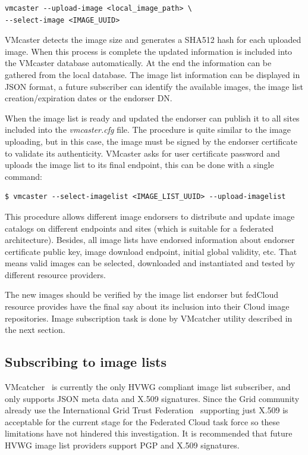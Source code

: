 \documentclass{cai}
\begin{document}
\begin{verbatim}
vmcaster --upload-image <local_image_path> \
--select-image <IMAGE_UUID>
\end{verbatim}

VMcaster detects the image size and generates a SHA512 hash for each uploaded image. When this process is complete the updated information is included into the VMcaster database automatically.
At the end the information can be gathered from the local database. 
The image list information can be displayed in JSON format, a future subscriber can identify the available images, the image list creation/expiration dates or the endorser DN.

When the image list is ready and updated the endorser can publish it to all sites included into the \textit{vmcaster.cfg} file. 
The procedure is quite similar to the image uploading, but in this case, the image must be signed by the endorser certificate to validate its authenticity.
VMcaster asks for user certificate password and uploads the image list to its final endpoint, this can be done with a single command:
\begin{verbatim}
$ vmcaster --select-imagelist <IMAGE_LIST_UUID> --upload-imagelist
\end{verbatim}
This procedure allows different image endorsers to distribute and update image catalogs on different endpoints and sites (which is suitable for a federated architecture).
Besides, all image lists have endorsed information about endorser certificate public key, image download endpoint, initial global validity, etc. 
That means valid images can be selected, downloaded and instantiated and tested by different resource providers.

The new images should be verified by the image list endorser but fedCloud resource provides have the final say about its inclusion into their Cloud image repositories. 
Image subscription task is done by VMcatcher utility described in the next section.


\subsection{Subscribing to image lists}
VMcatcher~\cite{vmcatcher} is currently the only HVWG compliant image list subscriber, and only supports JSON meta data and X.509 signatures. Since the Grid community already use the International Grid Trust Federation~\cite{igtf} supporting just X.509 is acceptable for the current stage for the Federated Cloud task force so these limitations have not hindered this investigation. 
It is recommended that future HVWG image list providers support PGP and X.509 signatures.
\end{document}
